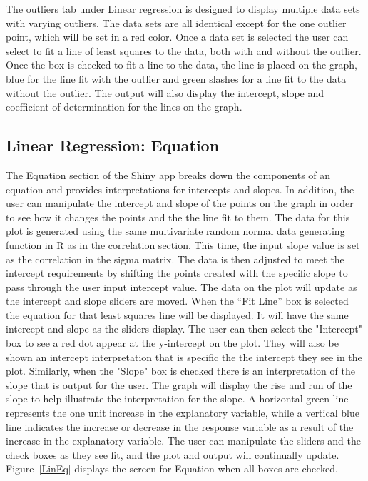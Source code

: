 \documentclass[11pt]{book}
\begin{document}
 The outliers tab under Linear regression is designed to display multiple data sets with varying outliers.  The data sets are all identical except for the one outlier point, which will be set in a red color.  Once a data set is selected the user can select to fit a line of least squares to the data, both with and without the outlier.  Once the box is checked to fit a line to the data, the line is placed on the graph, blue for the line fit with the outlier and green slashes for a line fit to the data without the outlier. The output will also display the intercept, slope and coefficient of determination for the lines on the graph.  
 

\subsection{Linear Regression: Equation}

The Equation section of the Shiny app breaks down the components of an equation and provides interpretations for intercepts and slopes.  In addition, the user can manipulate the intercept and slope of the points on the graph in order to see how it changes the points and the the line fit to them.  The data for this plot is generated using the same multivariate random normal data generating function in R as in the correlation section. This time, the input slope value is set as the correlation in the sigma matrix. The data is then adjusted to meet the intercept requirements by shifting the points created with the specific slope to pass through the user input intercept value. The data on the plot will update as the intercept and slope sliders are moved.  When the  ``Fit Line'' box is selected the equation for that least squares line will be displayed. It will have the same intercept and slope as the sliders display. The user can then select the "Intercept" box to see a red dot appear at the y-intercept on the plot. They will also be shown an intercept interpretation that is specific the the intercept they see in the plot. Similarly, when the "Slope" box is checked there is an interpretation of the slope that is output for the user.  The graph will display the rise and run of the slope to help illustrate the interpretation for the slope. A horizontal green line represents the one unit increase in the explanatory variable, while a vertical blue line indicates the increase or decrease in the response variable as a result of the increase in the explanatory variable. The user can manipulate the sliders and the check boxes as they see fit, and the plot and output will continually update. Figure~\ref{LinEq} displays the screen for Equation when all boxes are checked. 
\end{document}
